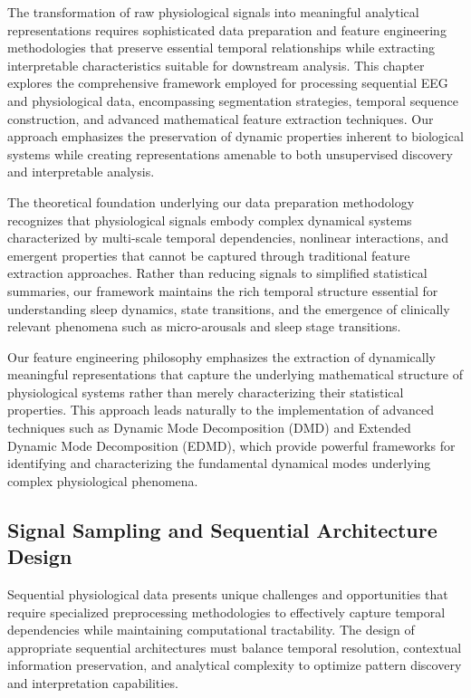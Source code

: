 \documentclass[a4paper,12pt,twoside]{article}
\begin{document}
The transformation of raw physiological signals into meaningful analytical representations requires sophisticated data preparation and feature engineering methodologies that preserve essential temporal relationships while extracting interpretable characteristics suitable for downstream analysis. This chapter explores the comprehensive framework employed for processing sequential EEG and physiological data, encompassing segmentation strategies, temporal sequence construction, and advanced mathematical feature extraction techniques. Our approach emphasizes the preservation of dynamic properties inherent to biological systems while creating representations amenable to both unsupervised discovery and interpretable analysis.

The theoretical foundation underlying our data preparation methodology recognizes that physiological signals embody complex dynamical systems characterized by multi-scale temporal dependencies, nonlinear interactions, and emergent properties that cannot be captured through traditional feature extraction approaches. Rather than reducing signals to simplified statistical summaries, our framework maintains the rich temporal structure essential for understanding sleep dynamics, state transitions, and the emergence of clinically relevant phenomena such as micro-arousals and sleep stage transitions.

Our feature engineering philosophy emphasizes the extraction of dynamically meaningful representations that capture the underlying mathematical structure of physiological systems rather than merely characterizing their statistical properties. This approach leads naturally to the implementation of advanced techniques such as Dynamic Mode Decomposition (DMD) and Extended Dynamic Mode Decomposition (EDMD), which provide powerful frameworks for identifying and characterizing the fundamental dynamical modes underlying complex physiological phenomena.

\subsection{Signal Sampling and Sequential Architecture Design}

Sequential physiological data presents unique challenges and opportunities that require specialized preprocessing methodologies to effectively capture temporal dependencies while maintaining computational tractability. The design of appropriate sequential architectures must balance temporal resolution, contextual information preservation, and analytical complexity to optimize pattern discovery and interpretation capabilities.
\end{document}
